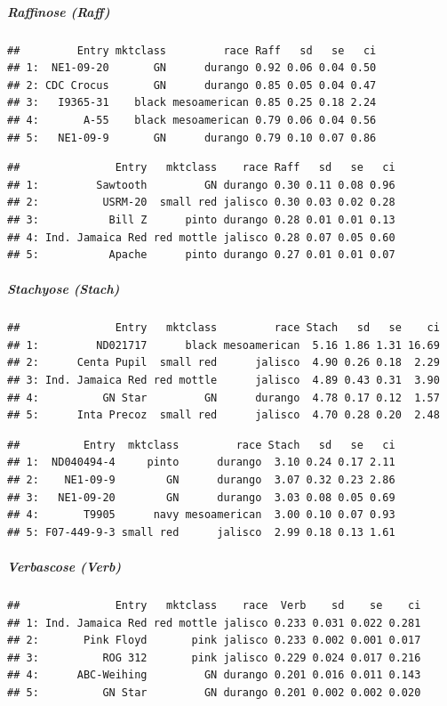 \documentclass[11pt,]{article}
\begin{document}
\subparagraph{Raffinose (Raff)}\label{raffinose-raff}

\begin{verbatim}
##         Entry mktclass         race Raff   sd   se   ci
## 1:  NE1-09-20       GN      durango 0.92 0.06 0.04 0.50
## 2: CDC Crocus       GN      durango 0.85 0.05 0.04 0.47
## 3:   I9365-31    black mesoamerican 0.85 0.25 0.18 2.24
## 4:       A-55    black mesoamerican 0.79 0.06 0.04 0.56
## 5:   NE1-09-9       GN      durango 0.79 0.10 0.07 0.86
\end{verbatim}

\begin{verbatim}
##               Entry   mktclass    race Raff   sd   se   ci
## 1:         Sawtooth         GN durango 0.30 0.11 0.08 0.96
## 2:          USRM-20  small red jalisco 0.30 0.03 0.02 0.28
## 3:           Bill Z      pinto durango 0.28 0.01 0.01 0.13
## 4: Ind. Jamaica Red red mottle jalisco 0.28 0.07 0.05 0.60
## 5:           Apache      pinto durango 0.27 0.01 0.01 0.07
\end{verbatim}

\subparagraph{Stachyose (Stach)}\label{stachyose-stach}

\begin{verbatim}
##               Entry   mktclass         race Stach   sd   se    ci
## 1:         ND021717      black mesoamerican  5.16 1.86 1.31 16.69
## 2:      Centa Pupil  small red      jalisco  4.90 0.26 0.18  2.29
## 3: Ind. Jamaica Red red mottle      jalisco  4.89 0.43 0.31  3.90
## 4:          GN Star         GN      durango  4.78 0.17 0.12  1.57
## 5:      Inta Precoz  small red      jalisco  4.70 0.28 0.20  2.48
\end{verbatim}

\begin{verbatim}
##          Entry  mktclass         race Stach   sd   se   ci
## 1:  ND040494-4     pinto      durango  3.10 0.24 0.17 2.11
## 2:    NE1-09-9        GN      durango  3.07 0.32 0.23 2.86
## 3:   NE1-09-20        GN      durango  3.03 0.08 0.05 0.69
## 4:       T9905      navy mesoamerican  3.00 0.10 0.07 0.93
## 5: F07-449-9-3 small red      jalisco  2.99 0.18 0.13 1.61
\end{verbatim}

\subparagraph{Verbascose (Verb)}\label{verbascose-verb}

\begin{verbatim}
##               Entry   mktclass    race  Verb    sd    se    ci
## 1: Ind. Jamaica Red red mottle jalisco 0.233 0.031 0.022 0.281
## 2:       Pink Floyd       pink jalisco 0.233 0.002 0.001 0.017
## 3:          ROG 312       pink jalisco 0.229 0.024 0.017 0.216
## 4:      ABC-Weihing         GN durango 0.201 0.016 0.011 0.143
## 5:          GN Star         GN durango 0.201 0.002 0.002 0.020
\end{verbatim}
\end{document}
